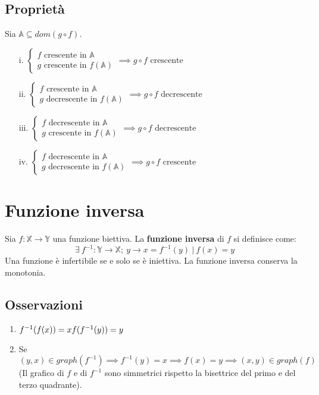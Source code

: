 \subsection{Proprietà}
Sia $\mathbb{A} \subseteq dom(g \circ f)$.
\begin{enumerate}
\item[i.] $\begin{cases}
f \text{ crescente in } \mathbb{A}\\
g \text{ crescente in } f(\mathbb{A})
\end{cases} \implies g \circ f \text{ crescente}$
\item[ii.] $\begin{cases}
f \text{ crescente in } \mathbb{A}\\
g \text{ decrescente in } f(\mathbb{A})
\end{cases} \implies g \circ f \text{ decrescente}$
\item[iii.] $\begin{cases}
f \text{ decrescente in } \mathbb{A}\\
g \text{ crescente in } f(\mathbb{A})
\end{cases} \implies g \circ f \text{ decrescente}$
\item[iv.] $\begin{cases}
f \text{ decrescente in } \mathbb{A}\\
g \text{ decrescente in } f(\mathbb{A})
\end{cases} \implies g \circ f \text{ crescente}$
\end{enumerate} 
\section{Funzione inversa}
Sia $f: \mathbb{X} \rightarrow \mathbb{Y}$ una funzione biettiva. La \textbf{funzione inversa} di $f$ si definisce come:
\begin{equation}
\exists\ f^{-1}: \mathbb{Y} \rightarrow \mathbb{X};\ y \rightarrow x = f^{-1}(y)\ |\ f(x) = y
\end{equation}
Una funzione \`e infertibile se e solo se \`e iniettiva. La funzione inversa conserva la monotonia.
\subsection{Osservazioni}
\begin{enumerate}
\item $f^{-1}(f(x))=x\\
f(f^{-1}(y))=y$
\item Se $(y,x) \in graph(f^{-1}) \implies f^{-1}(y) = x \implies f(x)=y \implies (x,y) \in graph(f)$\\
(Il grafico di $f$ e di $f^{-1}$ sono simmetrici rispetto la bisettrice del primo e del terzo quadrante).
\end{enumerate}

